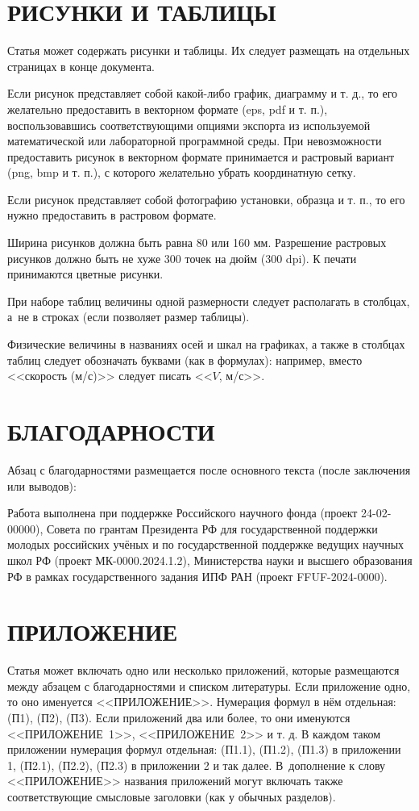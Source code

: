 \documentclass[12pt, a4paper]{article}
\begin{document}
\section{РИСУНКИ И ТАБЛИЦЫ}

Статья может содержать рисунки и таблицы. Их следует размещать на отдельных страницах в конце документа.

Если рисунок представляет собой какой-либо график, диаграмму и т. д., то его желательно предоставить в векторном формате (eps, pdf и т. п.), воспользовавшись соответствующими опциями экспорта из используемой математической или лабораторной программной среды. При невозможности предоставить рисунок в векторном формате принимается и растровый вариант (png, bmp и т. п.), с которого желательно убрать координатную сетку.

Если рисунок представляет собой фотографию установки, образца и т. п., то его нужно предоставить в растровом формате.

Ширина рисунков должна быть равна 80 или 160 мм. Разрешение растровых рисунков должно быть не хуже 300 точек на дюйм (300 dpi). К печати принимаются цветные рисунки.

При наборе таблиц величины одной размерности следует располагать в столбцах, а~не в строках (если позволяет размер таблицы).

Физические величины в названиях осей и шкал на графиках, а также в столбцах таблиц следует обозначать буквами (как в формулах): например, вместо <<скорость (м/с)>> следует писать <<$V$, м/с>>.

\section{БЛАГОДАРНОСТИ}

Абзац с благодарностями размещается после основного текста (после заключения или выводов):

Работа выполнена при поддержке Российского научного фонда (проект 24-02-00000), Совета по грантам Президента РФ для государственной поддержки молодых российских учёных и по государственной поддержке ведущих научных школ РФ (проект МК-0000.2024.1.2), Министерства науки и высшего образования РФ в рамках государственного задания ИПФ РАН (проект FFUF-2024-0000).

\section*{\hfill ПРИЛОЖЕНИЕ}

Статья может включать одно или несколько приложений, которые размещаются между абзацем с благодарностями и списком литературы. Если приложение одно, то оно именуется <<ПРИЛОЖЕНИЕ>>. Нумерация формул в нём отдельная: (П1), (П2), (П3). Если приложений два или более, то они именуются <<ПРИЛОЖЕНИЕ~1>>, <<ПРИЛОЖЕНИЕ~2>> и т. д. В каждом таком приложении нумерация формул отдельная: (П1.1), (П1.2), (П1.3) в приложении 1, (П2.1), (П2.2), (П2.3) в приложении 2 и так далее. В~дополнение к слову <<ПРИЛОЖЕНИЕ>> названия приложений могут включать также соответствующие смысловые заголовки (как у обычных разделов).
\end{document}
